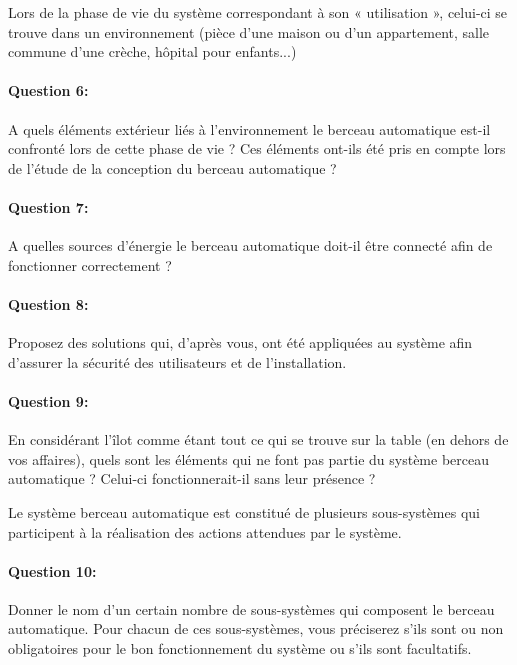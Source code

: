 
Lors de la phase de vie du système correspondant à son « utilisation », celui-ci se trouve dans un environnement (pièce d'une maison ou d'un appartement, salle commune d'une crèche, hôpital pour enfants...)

\paragraph{Question 6:} A quels éléments extérieur liés à l'environnement le berceau automatique est-il confronté lors de cette phase de vie ? Ces éléments ont-ils été pris en compte lors de l'étude de la conception du berceau automatique ?

\paragraph{Question 7:} A quelles sources d'énergie le berceau automatique doit-il être connecté afin de fonctionner correctement ?

\paragraph{Question 8:} Proposez des solutions qui, d'après vous, ont été appliquées au système afin d'assurer la sécurité des utilisateurs et de l'installation.

\paragraph{Question 9:} En considérant l'îlot comme étant \og tout ce qui se trouve sur la table \fg (en dehors de vos affaires), quels sont les éléments qui ne font pas partie du système \og berceau automatique \fg ? Celui-ci fonctionnerait-il sans leur présence ?


Le système berceau automatique est constitué de plusieurs sous-systèmes qui participent à la réalisation des actions attendues par le système.

\paragraph{Question 10:} Donner le nom d'un certain nombre de sous-systèmes qui composent le berceau automatique. Pour chacun de ces sous-systèmes, vous préciserez s'ils sont ou non obligatoires pour le bon fonctionnement du système ou s'ils sont facultatifs.



